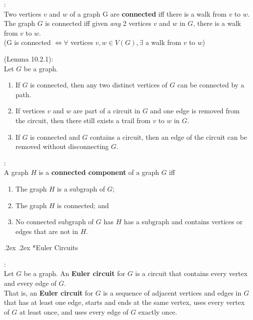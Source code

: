 \documentclass[10pt,landscape,a4paper]{article}
\makeatletter
\newenvironment{descitemize} %
{\begin{description}[leftmargin=*,before=\let\makelabel\descitemlabel]}
{\end{description}}
\newcommand{\descitemlabel}[1]{%
\textbullet\ \textbf{#1}%
}
\renewcommand{\subsection}{\@startsection{subsection}{1}{0mm}%
                                {.2ex}%
                                {.2ex}%
                                {\sffamily\bfseries}}
\makeatother
\begin{document}
\begin{multicols*}{4}
\begin{descitemize}
    \item [Connectedness]:\\
    Two vertices $v$ and $w$ of a graph G are \textbf{connected} iff there is a walk from $v$ to $w$.\\
    The graph $G$ is connected iff given \textit{any} 2 vertices $v$ and $w$ in $G$, there is a walk from $v$ to $w$. \\
    (G is connected $\Leftrightarrow \forall$ vertices $v,w\in V(G),\exists$ a walk from $v$ to $w$)

    \item [Lemma on connectedness] (Lemma 10.2.1):\\
    Let $G$ be a graph.
    \begin{enumerate}
      \item If $G$ is connected, then any two distinct vertices of $G$ can be connected by a path.
      \item If vertices $v$ and $w$ are part of a circuit in $G$ and one edge is removed from the circuit, then there still exists a trail from $v$ to $w$ in $G$.
      \item If $G$ is connected and $G$ contains a circuit, then an edge of the circuit can be removed without disconnecting $G$.
    \end{enumerate}

    \item [Connected Component]:\\
    A graph $H$ is a \textbf{connected component} of a graph $G$ iff
    \begin{enumerate}
      \item The graph $H$ is a subgraph of $G$;
      \item The graph $H$ is connected; and
      \item No connected subgraph of $G$ has $H$ has a subgraph and contains vertices or edges that are not in $H$.
    \end{enumerate}


  \end{descitemize}
  \columnbreak
  \subsection*{Euler Circuits}
  \begin{descitemize}
    \item [Euler Circuit]:\\
    Let $G$ be a graph. An \textbf{Euler circuit} for $G$ is a circuit that contains every vertex and every edge of $G$.\\
    That is, an \textbf{Euler circuit} for $G$ is a sequence of adjacent vertices and edges in $G$ that has at least one edge, starts and ends at the same vertex, uses every vertex of $G$ at least once, and uses every edge of $G$ exactly once.


\end{descitemize}
\end{multicols*}
\end{document}
